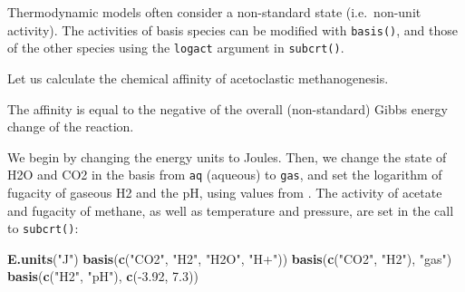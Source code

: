 \documentclass[]{tufte-handout}
\newenvironment{Shaded}{}{}
\newcommand{\KeywordTok}[1]{\textcolor[rgb]{0.00,0.44,0.13}{\textbf{#1}}}
\newcommand{\DataTypeTok}[1]{\textcolor[rgb]{0.56,0.13,0.00}{#1}}
\newcommand{\DecValTok}[1]{\textcolor[rgb]{0.25,0.63,0.44}{#1}}
\newcommand{\FloatTok}[1]{\textcolor[rgb]{0.25,0.63,0.44}{#1}}
\newcommand{\StringTok}[1]{\textcolor[rgb]{0.25,0.44,0.63}{#1}}
\newcommand{\OperatorTok}[1]{\textcolor[rgb]{0.40,0.40,0.40}{#1}}
\newcommand{\NormalTok}[1]{#1}
\begin{document}
Thermodynamic models often consider a non-standard state (i.e.~non-unit
activity). The activities of basis species can be modified with
{\texttt{basis()}}, and those of the other species using the
\texttt{logact} argument in {\texttt{subcrt()}}.

Let us calculate the chemical affinity of acetoclastic methanogenesis.

\begin{marginfigure}
The affinity is equal to the negative of the overall (non-standard)
Gibbs energy change of the reaction.
\end{marginfigure}

We begin by changing the energy units to Joules. Then, we change the
state of H2O and CO2 in the basis from \texttt{aq} (aqueous) to
\texttt{gas}, and set the logarithm of fugacity of gaseous H2 and the
pH, using values from \citet{MDS_13}. The activity of acetate and
fugacity of methane, as well as temperature and pressure, are set in the
call to {\texttt{subcrt()}}:

\begin{Shaded}
\begin{Highlighting}[]
\KeywordTok{E.units}\NormalTok{(}\StringTok{"J"}\NormalTok{)}
\KeywordTok{basis}\NormalTok{(}\KeywordTok{c}\NormalTok{(}\StringTok{"CO2"}\NormalTok{, }\StringTok{"H2"}\NormalTok{, }\StringTok{"H2O"}\NormalTok{, }\StringTok{"H+"}\NormalTok{))}
\KeywordTok{basis}\NormalTok{(}\KeywordTok{c}\NormalTok{(}\StringTok{"CO2"}\NormalTok{, }\StringTok{"H2"}\NormalTok{), }\StringTok{"gas"}\NormalTok{)}
\KeywordTok{basis}\NormalTok{(}\KeywordTok{c}\NormalTok{(}\StringTok{"H2"}\NormalTok{, }\StringTok{"pH"}\NormalTok{), }\KeywordTok{c}\NormalTok{(}\OperatorTok{-}\FloatTok{3.92}\NormalTok{, }\FloatTok{7.3}\NormalTok{))}
\end{Highlighting}
\end{Shaded}

\begin{Shaded}
\end{Shaded}
\end{document}
